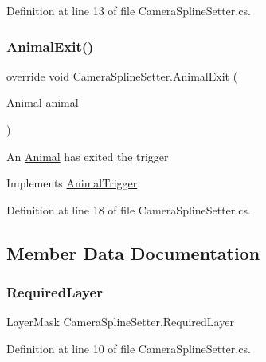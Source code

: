 Definition at line 13 of file Camera\+Spline\+Setter.\+cs.

\mbox{\label{class_camera_spline_setter_a4b75777822bf9b381e8a95c11d979e31}} 
\subsubsection{\texorpdfstring{Animal\+Exit()}{AnimalExit()}}
{\footnotesize\ttfamily override void Camera\+Spline\+Setter.\+Animal\+Exit (\begin{DoxyParamCaption}\item[{\mbox{\hyperlink{class_animal}{Animal}}}]{animal }\end{DoxyParamCaption})\hspace{0.3cm}{\ttfamily [virtual]}}



An \mbox{\hyperlink{class_animal}{Animal}} has exited the trigger 



Implements \mbox{\hyperlink{class_animal_trigger_aa1a7c2e90de76c2e089b2bae01813f5c}{Animal\+Trigger}}.



Definition at line 18 of file Camera\+Spline\+Setter.\+cs.



\subsection{Member Data Documentation}
\mbox{\label{class_camera_spline_setter_ab63103e62e61cda51e37e56c13f786cb}} 
\subsubsection{\texorpdfstring{Required\+Layer}{RequiredLayer}}
{\footnotesize\ttfamily Layer\+Mask Camera\+Spline\+Setter.\+Required\+Layer}



Definition at line 10 of file Camera\+Spline\+Setter.\+cs.

\mbox{\label{class_camera_spline_setter_a2aa70cc75ebbb8198812b7c3be4a13cf}} 
